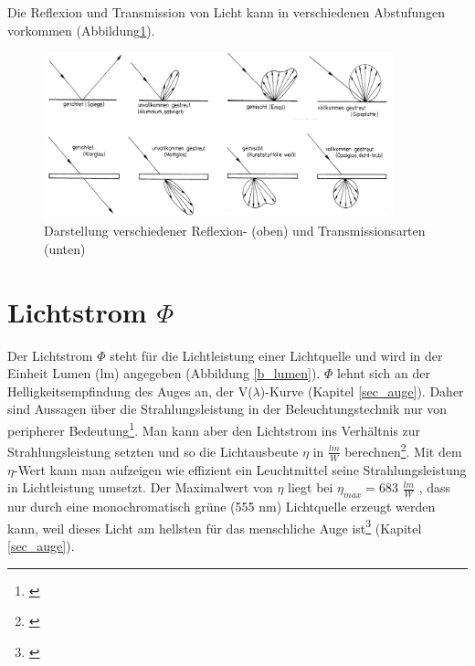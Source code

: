 Die Reflexion und Transmission von Licht kann in verschiedenen Abstufungen vorkommen (Abbildung\ref{b_reftrans}).

\begin{figure}[H]     %
\centering
\includegraphics[width=0.9\textwidth]{bilder/reftrans} 
\caption {Darstellung verschiedener Reflexion- (oben) und Transmissionsarten (unten) \protect\footnotemark}\label{b_reftrans}
\end{figure}

 


\section{Lichtstrom $\Phi$} \label{sec_lumen}
Der Lichtstrom $\Phi$ steht für die Lichtleistung einer Lichtquelle und wird in der Einheit Lumen (lm) angegeben (Abbildung \ref{b_lumen}). $\Phi$ lehnt sich an der Helligkeitsempfindung des Auges an, der V($\lambda$)-Kurve (Kapitel \ref{sec_auge}). Daher sind Aussagen über die Strahlungsleistung in der Beleuchtungstechnik nur von peripherer Bedeutung\footnote{\cite[23]{ris}}. Man kann aber den Lichtstrom ins Verhältnis zur Strahlungsleistung setzten und so die Lichtausbeute $\eta$ in $\frac{lm}{W}$ berechnen\footnote{\cite[35]{greule}}. Mit dem $\eta$-Wert kann man aufzeigen wie effizient ein Leuchtmittel seine Strahlungsleistung in Lichtleistung umsetzt. Der Maximalwert von $\eta$ liegt bei $\eta_{max}=683$ $\frac{lm}{W}$ , dass nur durch eine monochromatisch grüne (555 nm) Lichtquelle erzeugt werden kann, weil dieses Licht am hellsten für das menschliche Auge ist\footnote{\cite[36]{greule}} (Kapitel \ref{sec_auge}).

